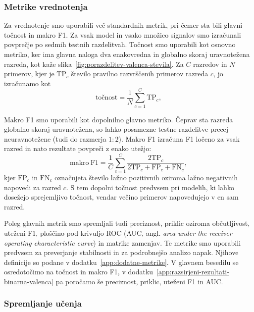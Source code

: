 \subsubsection*{Metrike vrednotenja}
\label{subsec:metrike}

Za vrednotenje smo uporabili več standardnih metrik, pri čemer sta bili glavni točnost in makro F1.
Za vsak model in vsako množico signalov smo izračunali povprečje po sedmih testnih razdelitvah.
Točnost smo uporabili kot osnovno metriko, ker ima glavna naloga dva enakovredna in globalno skoraj uravnotežena razreda, kot kaže slika~\ref{fig:porazdelitev-valenca-stevila}.
Za $C$ razredov in $N$ primerov, kjer je $\mathrm{TP}_c$ število pravilno razvrščenih primerov razreda $c$, jo izračunamo kot
\begin{equation}
    \text{točnost} = \frac{1}{N} \sum_{c=1}^{C} \mathrm{TP}_c,
\end{equation}

Makro F1 smo uporabili kot dopolnilno glavno metriko.
Čeprav sta razreda globalno skoraj uravnotežena, so lahko posamezne testne razdelitve precej neuravnotežene (tudi do razmerja $1:2$).
Makro F1 izračuna F1 ločeno za vsak razred in nato rezultate povpreči z enako utežjo:
\begin{equation}
    \mathrm{makro\ F1} = \frac{1}{C} \sum_{c=1}^{C} \frac{2\mathrm{TP}_c}{2\mathrm{TP}_c + \mathrm{FP}_c + \mathrm{FN}_c},
\end{equation}
kjer $\mathrm{FP}_c$ in $\mathrm{FN}_c$ označujeta število lažno pozitivnih oziroma lažno negativnih napovedi za razred $c$.
S tem dopolni točnost predvsem pri modelih, ki lahko dosežejo sprejemljivo točnost, vendar večino primerov napovedujejo v en sam razred.

Poleg glavnih metrik smo spremljali tudi preciznost, priklic oziroma občutljivost, uteženi F1, ploščino pod krivuljo ROC (AUC, angl. \emph{area under the receiver operating characteristic curve}) in matrike zamenjav.
Te metrike smo uporabili predvsem za preverjanje stabilnosti in za podrobnejšo analizo napak.
Njihove definicije so podane v dodatku~\ref{app:dodatne-metrike}.
V glavnem besedilu se osredotočimo na točnost in makro F1, v dodatku~\ref{app:razsirjeni-rezultati-binarna-valenca} pa poročamo še preciznost, priklic, uteženi F1 in AUC.

\subsubsection*{Spremljanje učenja}
\label{subsec:spremljanje-ucenja}


